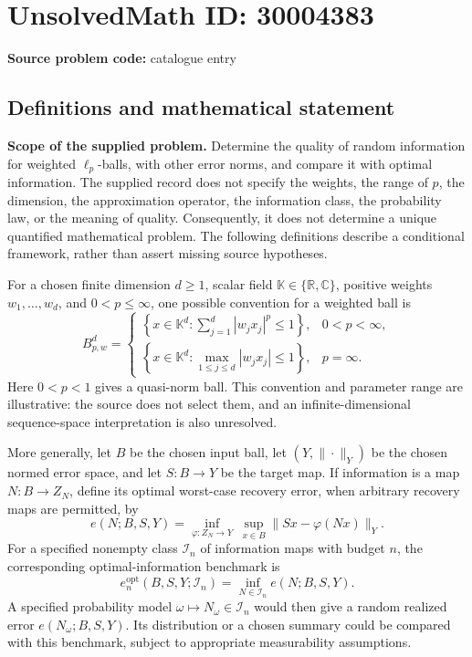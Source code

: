 \documentclass[11pt]{article}
\newcommand{\R}{\mathbb{R}}
\newcommand{\C}{\mathbb{C}}
\begin{document}
\section*{UnsolvedMath ID: 30004383}
\textbf{Source problem code:} catalogue entry
\subsection{Definitions and mathematical statement}
\textbf{Scope of the supplied problem.} Determine the quality of random information for weighted $\ell_p$-balls, with other error norms, and compare it with optimal information. The supplied record does not specify the weights, the range of $p$, the dimension, the approximation operator, the information class, the probability law, or the meaning of quality. Consequently, it does not determine a unique quantified mathematical problem. The following definitions describe a conditional framework, rather than assert missing source hypotheses.

For a chosen finite dimension $d\geq 1$, scalar field $\mathbb K\in\{\R,\C\}$, positive weights $w_1,\ldots,w_d$, and $0<p\leq\infty$, one possible convention for a weighted ball is
\[
 B_{p,w}^{d}=\begin{cases}
 \left\{x\in\mathbb K^d:\displaystyle\sum_{j=1}^{d}|w_jx_j|^p\leq 1\right\},&0<p<\infty,\\
 \left\{x\in\mathbb K^d:\displaystyle\max_{1\leq j\leq d}|w_jx_j|\leq 1\right\},&p=\infty.
 \end{cases}
\]
Here $0<p<1$ gives a quasi-norm ball. This convention and parameter range are illustrative: the source does not select them, and an infinite-dimensional sequence-space interpretation is also unresolved.

More generally, let $B$ be the chosen input ball, let $(Y,\|\cdot\|_Y)$ be the chosen normed error space, and let $S:B\to Y$ be the target map. If information is a map $N:B\to Z_N$, define its optimal worst-case recovery error, when arbitrary recovery maps are permitted, by
\[
 e(N;B,S,Y)=\inf_{\varphi:Z_N\to Y}\ \sup_{x\in B}\|Sx-\varphi(Nx)\|_Y.
\]
For a specified nonempty class $\mathcal I_n$ of information maps with budget $n$, the corresponding optimal-information benchmark is
\[
 e_n^{\mathrm{opt}}(B,S,Y;\mathcal I_n)
 =\inf_{N\in\mathcal I_n}e(N;B,S,Y).
\]
A specified probability model $\omega\mapsto N_\omega\in\mathcal I_n$ would then give a random realized error $e(N_\omega;B,S,Y)$. Its distribution or a chosen summary could be compared with this benchmark, subject to appropriate measurability assumptions.
\end{document}
